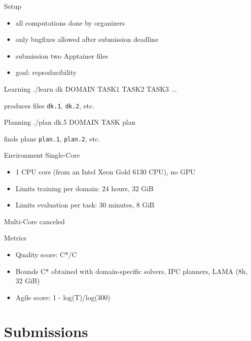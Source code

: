 \documentclass[aspectratio=169,xcolor=dvipsnames]{beamer}
\begin{document}
\begin{frame}{Setup}
    \begin{itemize}
        \item all computations done by organizers
        \item only bugfixes allowed after submission deadline
        \item submission two Apptainer files
        \item goal: reproducibility
    \end{itemize}

    \begin{block}{Learning}
        ./learn dk DOMAIN TASK1 TASK2 TASK3 ...
    \end{block}

    produces files \texttt{dk.1}, \texttt{dk.2}, etc.

    \begin{exampleblock}{Planning}
        ./plan dk.5 DOMAIN TASK plan
    \end{exampleblock}

    finds plans \texttt{plan.1}, \texttt{plan.2}, etc.
\end{frame}

\begin{frame}{Environment}
    Single-Core
    \begin{itemize}
        \item 1 CPU core (from an Intel Xeon Gold 6130 CPU), no GPU
        \item Limits \alert{training} per domain: 24 hours, 32 GiB
        \item Limits \alert{evaluation} per task: 30 minutes, 8 GiB
    \end{itemize}

    \bigskip
    Multi-Core canceled
\end{frame}

\begin{frame}{Metrics}
    \begin{itemize}
        \item Quality score: C*/C
        \item Bounds C* obtained with domain-specific solvers, IPC planners, LAMA (8h, 32 GiB)
        \item Agile score: 1 - log(T)/log(300)
    \end{itemize}
\end{frame}

\section{Submissions}
\end{document}
